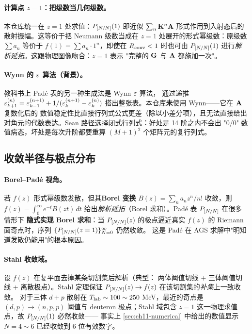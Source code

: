 \paragraph{计算点 \texorpdfstring{$z=1$}{z=1}：把级数当几何级数。}
本仓库统一在 \(z=1\) 处求值：\(P_{[N/N]}(1)\) 即近似 \(\sum_n \mathbf{K}^n \mathbf{A}\)
形式作用到入射态后的散射振幅。这等价于把 Neumann 级数当成在
\(z=1\) 处展开的形式幂级数：原级数 \(\sum a_n\) 等价于
\(f(1) = \sum a_n \cdot 1^n\)，即使在 \(R_{\text{conv}} < 1\) 时也可由 \(P_{[N/N]}(1)\)
进行\emph{解析延拓}。这跟物理图像吻合：\(z=1\) 表示
"完整的 \(\mathbf{G}\) 与 \(\mathbf{A}\) 都施加一次"。

\paragraph{Wynn 的 \(\varepsilon\) 算法（背景）。}
教科书上 Padé 表的另一种生成法是 Wynn \(\varepsilon\) 算法，
通过递推 \(\varepsilon_{k+1}^{(n)} = \varepsilon_{k-1}^{(n+1)} + 1/(\varepsilon_k^{(n+1)} - \varepsilon_k^{(n)})\)
搭出整张表。本仓库\textbf{未}使用 Wynn——它在 \(\mathbf{A}\) 复数化后的
数值稳定性比直接行列式公式更差（除以小差分项），且无法直接给出
对角元的代数表达。Sean 路径选择闭式行列式：好处是 14 阶之内不会出
"\(0/0\)" 数值病态，坏处是每次升阶都要重算 \((M+1)^2\) 个矩阵元的复行列式。

\subsection{收敛半径与极点分布}
\label{subsec:ch11-radius-pole}

\paragraph{Borel--Padé 视角。}
若 \(f(z)\) 形式幂级数发散，但其\textbf{Borel 变换}
\(B(z) = \sum_n a_n z^n / n!\) 收敛，则 \(f(z) = \int_0^{\infty} e^{-t} B(zt)\,dt\)
给出\emph{解析延拓}（Borel 求和）。Padé 表 \(P_{[N/N]}\) 在很多情形下
\textbf{隐式实现 Borel 求和}：当 \(P_{[N/N]}(z)\) 的极点逼近真实 \(f(z)\)
的 Riemann 面奇点时，序列 \(\{P_{[N/N]}(z=1)\}_{N=0}^{\infty}\) 仍然收敛。
这是 Padé 在 AGS 求解中"明知道发散仍能用"的根本原因。

\paragraph{Stahl 收敛域。}
设 \(f(z)\) 在复平面去掉某条切割集后解析（典型：
两体阈值切线 + 三体阈值切线 + 离散极点）。Stahl 定理保证
\(P_{[N/N]}(z) \to f(z)\) 在该切割集的\emph{补集}上一致收敛。
对于三体 \(d+p\) 散射在 \({T_{\text{lab}}} \sim 100\sim 250\) MeV，最近的奇点是
\((d, p) \to (n, p, p)\) 阈值与 deuteron 极点；Stahl 域包含
\(z=1\) 这一物理求值点，故 \(P_{[N/N]}(1)\) 必然收敛——
事实上 \cref{sec:ch11-numerical} 中给出的数值显示 \(N=4\sim 6\) 已经收敛到 6 位有效数字。

